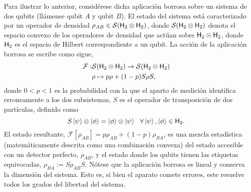 \documentclass[10pt]{article}
\newcommand{\mcS}{\mathcal{S}}
\newcommand{\hilbert}{{\sf H}}
\newcommand{\mcF}{\mathcal{F}}
\newcommand{\Fuzzy}[1]{\mcF\left[#1\right]}
\begin{document}
Para ilustrar lo anterior, considérese dicha aplicación borrosa sobre un sistema de dos qubits (llámense qubit $A$ y qubit $B$). El estado del sistema está caracterizado por un operador de densidad $\rho_{AB} \in \mcS(\hilbert_2 \otimes \hilbert_2)$, donde $\mcS(\hilbert_2 \otimes \hilbert_2)$ denota el espacio convexo de los operadores de densidad que actúan sobre $\hilbert_2 \otimes \hilbert_2$, donde $\hilbert_2$ es el espacio de Hilbert correspondiente a un qubit. La acción de la aplicación borrosa se escribe como sigue,
\begin{align*}
\mcF:&\mcS(\hilbert_2 \otimes \hilbert_2)\to \mcS(\hilbert_2 \otimes \hilbert_2)\nonumber\\
&\rho \mapsto p\rho+(1-p)S\rho S,
\end{align*}
donde $0<p<1$ es la probabilidad con la que el aparto de medición identifica erroneamente a los dos subsistemas, $S$ es el operador de transposición de dos partículas, definido como 
$$S\ket{\psi}\otimes \ket{\phi}=\ket{\phi}\otimes \ket{\psi} \ \ \forall \ket{\psi},\ket{\phi}\in \hilbert_2.$$
%
El estado resultante, $\Fuzzy{\rho_{AB}}=p\rho_{AB}+(1-p)\rho_{BA}$, es una mezcla estadística (matemáticamente descrita como una combinación convexa) del estado accesible con un detector perfecto, $\rho_{AB}$, y el estado donde los qubits tienen las etiquetas equivocadas, $\rho_{BA}:=S\rho_{AB} S$. Nótese que la aplicación borrosa es lineal y conserva la dimensión del sistema. Esto es, si bien el aparato comete errores, este resuelve todos los grados del libertad del sistema.
\end{document}
